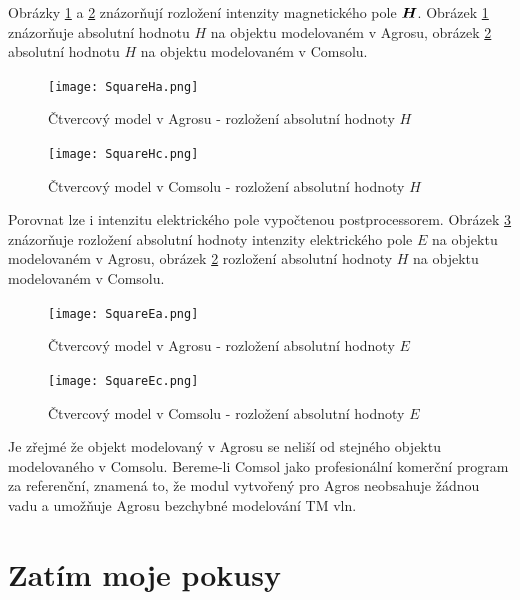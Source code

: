 \documentclass[12pt,a4paper,oneside]{article}
\numberwithin{equation}{section} %
\numberwithin{figure}{section} %
\numberwithin{table}{section} %
\renewcommand{\vec}[1]{\mbox{\boldmath$#1$}} %
\begin{document}
Obrázky \ref{SQaH} a \ref{SQcH} znázorňují rozložení intenzity magnetického pole $\vec{H}$. Obrázek \ref{SQaH} znázorňuje absolutní hodnotu $H$ na objektu modelovaném v Agrosu, obrázek \ref{SQcH} absolutní hodnotu $H$ na objektu modelovaném v Comsolu.

\begin{figure}
\begin{center}
\texttt{[image: SquareHa.png]} 
\caption{Čtvercový model v Agrosu - rozložení absolutní hodnoty $H$} 
\label{SQaH}
\end{center}
\end{figure}

\begin{figure}
\begin{center}
\texttt{[image: SquareHc.png]} 
\caption{Čtvercový model v Comsolu - rozložení absolutní hodnoty $H$} 
\label{SQcH}
\end{center}
\end{figure}

Porovnat lze i intenzitu elektrického pole vypočtenou postprocessorem. Obrázek \ref{SQaE} znázorňuje rozložení absolutní hodnoty intenzity elektrického pole $E$ na objektu modelovaném v Agrosu, obrázek \ref{SQcH} rozložení absolutní hodnoty $H$ na objektu modelovaném v Comsolu.

\begin{figure}
\begin{center}
\texttt{[image: SquareEa.png]} 
\caption{Čtvercový model v Agrosu - rozložení absolutní hodnoty $E$} 
\label{SQaE}
\end{center}
\end{figure}

\begin{figure}
\begin{center}
\texttt{[image: SquareEc.png]} 
\caption{Čtvercový model v Comsolu - rozložení absolutní hodnoty $E$} 
\label{SQcE}
\end{center}
\end{figure}

Je zřejmé že objekt modelovaný v Agrosu se neliší od stejného objektu modelovaného v Comsolu. Bereme-li Comsol jako profesionální komerční program za referenční, znamená to, že modul vytvořený pro Agros neobsahuje žádnou vadu a umožňuje Agrosu bezchybné modelování TM vln.



\clearpage
\section{Zatím moje pokusy}
\end{document}
